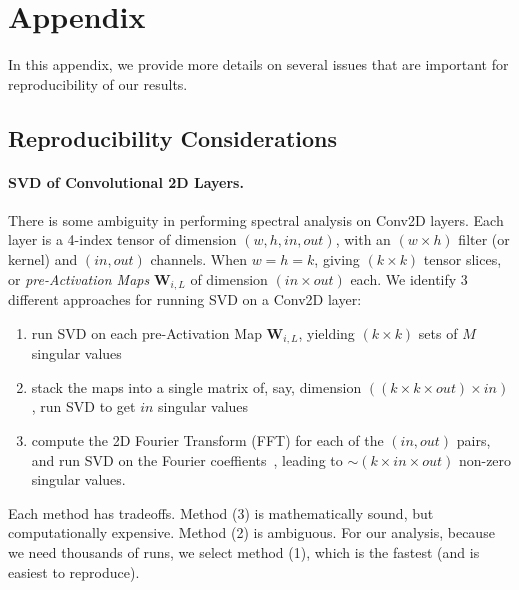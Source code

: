 \section{Appendix}
\label{sxn:appendix}

In this appendix, we provide more details on several issues that are important for reproducibility of our results.

\subsection{Reproducibility Considerations}


\paragraph{SVD of Convolutional 2D Layers.}

There is some ambiguity in performing spectral analysis on Conv2D layers.  
Each layer is a 4-index tensor of dimension $(w,h,in,out)$, with an $(w\times h)$ filter (or kernel) and $(in, out)$
channels. When $w=h=k$,  giving $(k\times k)$ tensor slices, or \emph{pre-Activation Maps} $\mathbf{W}_{i,L}$ of dimension $(in\times out)$ each. 
%
We identify 3 different approaches for running SVD on a Conv2D layer:
\begin{enumerate}
\item run SVD on each pre-Activation Map $\mathbf{W}_{i,L}$, yielding $(k\times k)$ sets of $M$ singular values
\item stack the maps into a single matrix of, say, dimension $((k\times k\times out)\times in)$, run SVD to get $in$ singular values
\item compute the 2D Fourier Transform (FFT) for each of the $(in, out)$ pairs, and run SVD on the Fourier coeffients~\cite{CNNSVD}, leading to $\sim(k\times in\times out)$ non-zero singular values.
\end{enumerate}
Each method has tradeoffs.  
Method (3) is mathematically sound, but computationally expensive. Method (2) is ambiguous.
For our analysis, because we need thousands of runs, we select method (1), which is the fastest (and is easiest to reproduce).

